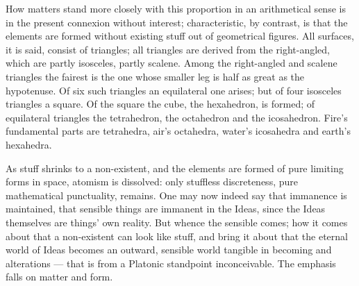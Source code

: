\documentclass[12pt,a4paper]{book}
\begin{document}
How matters stand more closely with this proportion in an arithmetical sense is in the present connexion
without interest; characteristic, by contrast, is that the elements are formed without existing stuff out of
geometrical figures. All surfaces, it is said, consist of triangles; all triangles are derived from the
right-angled, which are partly isosceles, partly scalene. Among the right-angled and scalene triangles the
fairest is the one whose smaller leg is half as great as the hypotenuse. Of six such triangles an equilateral
one arises; but of four isosceles triangles a square. Of the square the cube, the hexahedron, is formed; of
equilateral triangles the tetrahedron, the octahedron and the icosahedron. Fire's fundamental parts are
tetrahedra, air's octahedra, water's icosahedra and earth's hexahedra.

As stuff shrinks to a non-existent, and the elements are formed of pure limiting forms in space, atomism is
dissolved: only stuffless discreteness, pure mathematical punctuality, remains. One may now indeed say that
immanence is maintained, that sensible things are immanent in the Ideas, since the Ideas themselves are
things' own reality. But whence the sensible comes; how it comes about that a non-existent can look like
stuff, and bring it about that the eternal world of Ideas becomes an outward, sensible world tangible in
becoming and alterations --- that is from a Platonic standpoint inconceivable. The emphasis falls on matter
and form.
\end{document}
